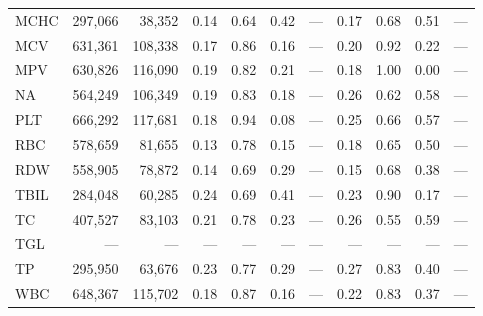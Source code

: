 \begin{table}[ht]
\begin{tabular}{lrrrrrrrrrr}
MCHC & 297,066 & 38,352 & 0.14 & 0.64 & 0.42 & --- & 0.17 & 0.68 & 0.51 & --- \\
MCV & 631,361 & 108,338 & 0.17 & 0.86 & 0.16 & --- & 0.20 & 0.92 & 0.22 & --- \\
MPV & 630,826 & 116,090 & 0.19 & 0.82 & 0.21 & --- & 0.18 & 1.00 & 0.00 & --- \\
NA & 564,249 & 106,349 & 0.19 & 0.83 & 0.18 & --- & 0.26 & 0.62 & 0.58 & --- \\
PLT & 666,292 & 117,681 & 0.18 & 0.94 & 0.08 & --- & 0.25 & 0.66 & 0.57 & --- \\
RBC & 578,659 & 81,655 & 0.13 & 0.78 & 0.15 & --- & 0.18 & 0.65 & 0.50 & --- \\
RDW & 558,905 & 78,872 & 0.14 & 0.69 & 0.29 & --- & 0.15 & 0.68 & 0.38 & --- \\
TBIL & 284,048 & 60,285 & 0.24 & 0.69 & 0.41 & --- & 0.23 & 0.90 & 0.17 & --- \\
TC & 407,527 & 83,103 & 0.21 & 0.78 & 0.23 & --- & 0.26 & 0.55 & 0.59 & --- \\
TGL & --- & --- & --- & --- & --- & --- & --- & --- & --- & --- \\
TP & 295,950 & 63,676 & 0.23 & 0.77 & 0.29 & --- & 0.27 & 0.83 & 0.40 & --- \\
WBC & 648,367 & 115,702 & 0.18 & 0.87 & 0.16 & --- & 0.22 & 0.83 & 0.37 & --- \\
\bottomrule
\end{tabular}
\label{tab:12_eval_detail_chs_anemia_unspecified}
\end{table}